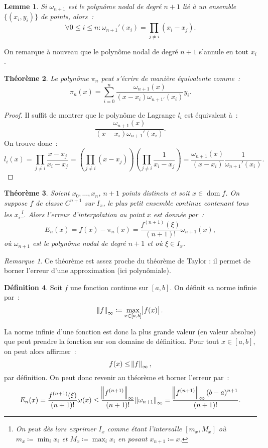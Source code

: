 \documentclass{article}
\newtheorem{thm}{Théorème}[section]
\newtheorem{lem}[thm]{Lemme}
\theoremstyle{definition}
\newtheorem{déf}[thm]{Définition}
\theoremstyle{remark}
\newtheorem*{rmq}{Remarque}
\DeclareMathOperator{\dom}{dom}  %
\begin{document}
		\begin{lem} Si $\omega_{n+1}$ est le polynôme nodal de degré $n+1$ lié à un ensemble $\{(x_i, y_i)\}$ de points, alors~:
		\[\forall 0 \leq i \leq n : \omega_{n+1}'(x_i) = \prod_{j \neq i}(x_i-x_j).\]
		\end{lem}

		On remarque à nouveau que le polynôme nodal de degré $n+1$ s'annule en tout $x_i$.

		\begin{thm} Le polynôme $\pi_n$ peut s'écrire de manière équivalente comme~:
		\[\pi_n(x) = \sum_{i=0}^n\frac {\omega_{n+1}(x)}{(x-x_i)\omega_{n+1'}(x_i)}y_i.\]
		\end{thm}

		\begin{proof} Il suffit de montrer que le polynôme de Lagrange $l_i$ est équivalent à~:
		\[\frac {\omega_{n+1}(x)}{(x-x_i)\omega_{n+1}'(x_i)}.\]
		On trouve donc~:
		\[l_i(x) = \prod_{j \neq i}\frac {x-x_j}{x_i-x_j} = \left(\prod_{j \neq i}(x-x_j)\right)\left(\prod_{j \neq i}\frac 1{x_i-x_j}\right)
		= \frac {\omega_{n+1}(x)}{(x-x_i)}\frac 1{\omega_{n+1}'(x_i)}.\]
		\end{proof}

		\begin{thm}\label{thm:erreurinterpolation} Soient $x_0, \dotsc, x_n$, $n+1$ points distincts et soit $x \in \dom f$. On suppose $f$ de classe $C^{n+1}$
		sur $I_x$, le plus petit ensemble continue contenant tous les $x_i$\footnote{On peut dès lors exprimer $I_x$ comme étant l'intervalle $[m_x, M_x]$ où
		$m_x \coloneqq \min_i x_i$ et $M_x \coloneqq \max_i x_i$ en posant $x_{n+1} \coloneqq x$.}. Alors l'erreur d'interpolation au point $x$ est donnée
		par~:
		\[E_n(x) = f(x) - \pi_n(x) = \frac {f^{(n+1)}(\xi)}{(n+1)!}\omega_{n+1}(x),\]
		où $\omega_{n+1}$ est le polynôme nodal de degré $n+1$ et où $\xi \in I_x$.
		\end{thm}

		\begin{rmq} Ce théorème est assez proche du théorème de Taylor : il permet de borner l'erreur d'une approximation (ici polynômiale). \end{rmq}

		\begin{déf} Soit $f$ une fonction continue sur $[a, b]$. On définit sa norme infinie par~:
		\[\norm f_\infty \coloneqq \max_{x \in [a, b]}\abs{f(x)}.\]
		\end{déf}

		La norme infinie d'une fonction est donc la plus grande valeur (en valeur absolue) que peut prendre la fonction sur son domaine de définition.
		Pour tout $x \in [a, b]$, on peut alors affirmer~:
		\[f(x) \leq \norm f_\infty,\]
		par définition. On peut donc revenir au théorème et borner l'erreur par~:
		\[E_n(x) = \frac {f^{(n+1)}(\xi)}{(n+1)!}\omega(x) \leq \frac {\norm {f^{(n+1)}}_\infty}{(n+1)!}\norm {\omega_{n+1}}_\infty
		= \frac {\norm {f^{(n+1)}}_\infty (b-a)^{n+1}}{(n+1)!}.\]
\end{document}
